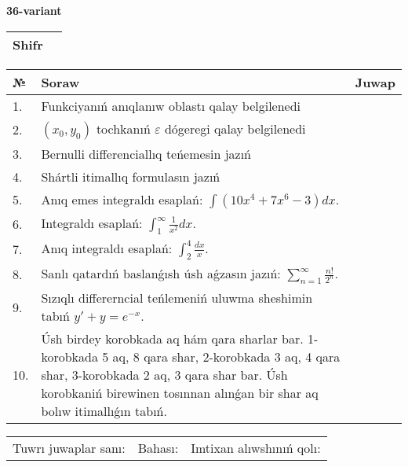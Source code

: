 \documentclass{article}
\begin{document}
  \egroup
  
  \newpage
  
  
  \textbf{36-variant}\\
  
  \bgroup
  \def\arraystretch{1.6} %
  
  \begin{tabular}{|m{5.7cm}|m{9.5cm}|}
  \hline
  Shifr & \\
  \hline
  \end{tabular}
  
  \vspace{1cm}
  
  \begin{tabular}{|m{0.7cm}|m{10cm}|m{4cm}|}
  \hline
  № & Soraw & Juwap \\
  \hline
  1. & Funkciyanıń anıqlanıw oblastı qalay belgilenedi &  \\
  \hline
  2. & \((x_0,y_0)\) tochkanıń \(\varepsilon\) dógeregi qalay belgilenedi &  \\
  \hline
  3. & Bernulli differenciallıq teńemesin jazıń &  \\
  \hline
  4. & Shártli itimallıq formulasın jazıń &  \\
  \hline
  5. & Anıq emes integraldı esaplań: \(\int{\left( 10x^{4} + 7x^{6} - 3 \right)dx}\). &  \\
  \hline
  6. & Integraldı esaplań: \(\int_{1}^{\infty}{\frac{1}{x^2 }dx}\). &  \\
  \hline
  7. & Anıq integraldı esaplań: \(\int_{2}^{4}\frac{dx}{x}\). &  \\
  \hline
  8. & Sanlı qatardıń baslanǵısh úsh aǵzasın jazıń: \(\sum_{n = 1}^{\infty}\frac{n!}{2^{n}}\). &  \\
  \hline
  9. & Sızıqlı differerncial teńlemeniń uluwma sheshimin tabıń \(y' + y = e^{- x}\). &  \\
  \hline
  10. & Úsh birdey korobkada aq hám qara sharlar bar. 1-korobkada 5 aq, 8 qara shar, 2-korobkada 3 aq, 4 qara shar, 3-korobkada 2 aq, 3 qara shar bar. Úsh korobkaniń birewinen tosınnan alınǵan bir shar aq bolıw itimallıǵın tabıń. &  \\
  \hline
  \end{tabular}
  
  \vspace{1cm}
  
  \begin{tabular}{lll}
  Tuwrı juwaplar sanı: \underline{\hspace{1.5cm}} & 
  Bahası: \underline{\hspace{1.5cm}} & 
  Imtixan alıwshınıń qolı: \underline{\hspace{2cm}} \\
  \end{tabular}
  
\end{document}
